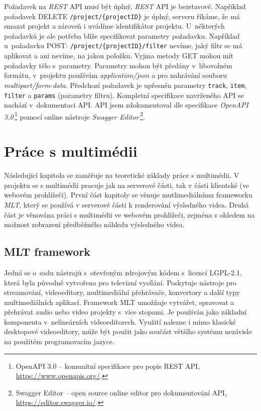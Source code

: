 Požadavek na \textit{REST} API musí být úplný, \textit{REST} API je bezstavové. Například požadavek DELETE \texttt{/project/\{projectID\}} je úplný, serveru říkáme, že má smazat projekt a zároveň i uvádíme identifikátor projektu. U~některých požadavků je ale potřeba blíže specifikovat parametry požadavku. Například u~požadavku POST: \texttt{/project/\{projectID\}/filter} nevíme, jaký filtr se má aplikovat a ani nevíme, na jakou položku. Vyjma metody GET mohou mít požadavky tělo s~parametry. Parametry mohou být předány v~libovolném formátu, v~projektu používám \textit{application/json} a pro nahrávání souboru \textit{multipart/form-data}. Předchozí požadavek je upřesněn parametry \texttt{track}, \texttt{item}, \texttt{filter} a \texttt{params} (parametry filtru). Kompletní specifikace navrženého API se nachází v~dokumentaci API. API jsem zdokumentoval dle specifikace \textit{OpenAPI 3.0}\,\footnote{OpenAPI 3.0 -- komunitní specifikace pro popis REST API, \url{https://www.openapis.org/}.} pomocí online nástroje \textit{Swagger Editor}\,\footnote{Swagger Editor -- open source online editor pro dokumentování API, \url{https://editor.swagger.io/}.}.

\chapter{Práce s multimédii}
Následující kapitola se zaměřuje na teoretické základy práce s multimédii. V projektu se s multimédii pracuje jak na serverové části, tak v části klientské (ve webovém prohlížeči). První část kapitoly se věnuje mutlimediálnímu frameworku \textit{MLT}, který se používá v serverové části k renderování výsledného videa. Druhá část je věnována práci s multimédii ve webovém prohlížeči, zejména s ohledem na možnost zobrazení předběžného náhledu výsledného videa.

\section{MLT framework}
Jedná se o~sadu nástrojů s~otevřeným zdrojovým kódem s~licencí LGPL-2.1, která byla původně vytvořena pro televizní vysílání. Poskytuje nástroje pro streamování, videoeditory, multimediální přehrávače, konvertory a další typy multimediálních aplikací. Framework MLT umožňuje vytvářet, spravovat a přehrávat audio nebo video projekty s~více stopami. Je používán jako základní komponenta v~nelineárních videoeditorech. Využití nalezne i mimo klasické desktopové videoeditory, může být použit jako součást většího systému nezávisle na použitém programovacím jazyce.

